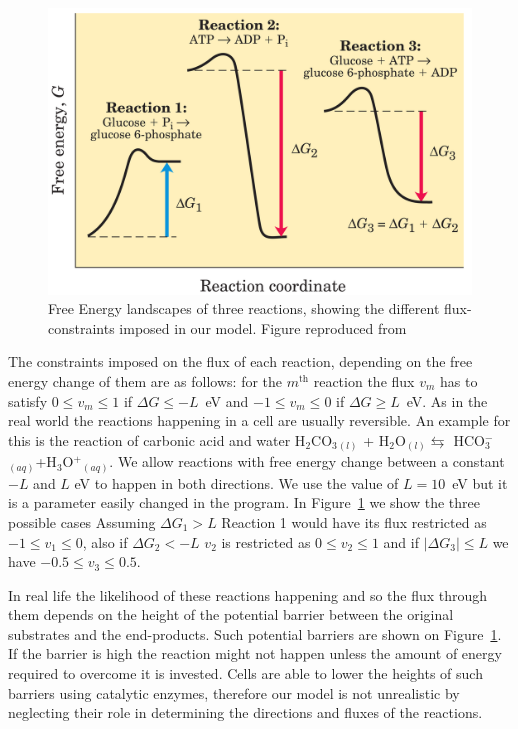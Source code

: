 \documentclass[a4paper,12pt]{article}
\begin{document}
	\begin{figure}[htpb]
		\centering
		\includegraphics[width=0.6\linewidth]{freeEchangeFig.png}
		\caption{Free Energy landscapes of three reactions, showing the different flux-constraints imposed in our model. Figure reproduced from \cite{principlesofbio}}
		\label{fig:freeEchangeFig}
	\end{figure}

	The constraints imposed on the flux of each reaction, depending on the free energy change of them are as follows: for the $m^\text{th}$ reaction the flux $v_m$ has to satisfy $0\leq v_m \leq 1 $ if $\Delta G \leq -L$~eV and $-1\leq v_m \leq 0 $ if $\Delta G \geq L$~eV. As in the real world the reactions happening in a cell are usually reversible. An example for this is the reaction of carbonic acid and water H$_2$CO$_3$$_{(l)}$ + H$_2$O$_{(l)} \leftrightarrows$ HCO$^-_3$$_{(aq)}$+H$_3$O$^+$$_{(aq)}$. We allow reactions with free energy change between a constant $-L$ and $L$ eV to happen in both directions. We use the value of $L=10$~eV but it is a parameter easily changed in the program. In Figure~\ref{fig:freeEchangeFig} we show the three possible cases Assuming $\Delta G_1 > L$ Reaction 1 would have its flux restricted as $-1\leq v_1 \leq 0$, also if $\Delta G_2 < -L$ $v_2$ is restricted as $0 \leq v_2 \leq 1$ and if $|\Delta G_3 | \leq L$ we have $-0.5 \leq v_3 \leq 0.5$. 

	In real life the likelihood of these reactions happening and so the flux through them depends on the height of the potential barrier between the original substrates and the end-products. Such potential barriers are shown on Figure~\ref{fig:freeEchangeFig}. If the barrier is high the reaction might not happen unless the amount of energy required to overcome it is invested. Cells are able to lower the heights of such barriers using catalytic enzymes, therefore our model is not unrealistic by neglecting their role in determining the directions and fluxes of the reactions. 
\end{document}
